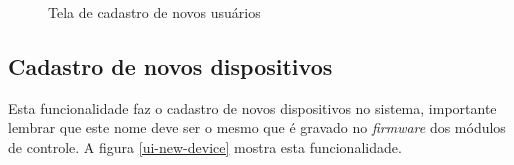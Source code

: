 \begin{figure}[H]
\caption{\label{ui-new-user} Tela de cadastro de novos usuários}
\end{figure}

\subsection{Cadastro de novos dispositivos}
Esta funcionalidade faz o cadastro de novos dispositivos no sistema, importante lembrar que este nome deve ser o mesmo que é gravado no \textit{firmware} dos módulos de controle. A figura \ref{ui-new-device} mostra esta funcionalidade.

